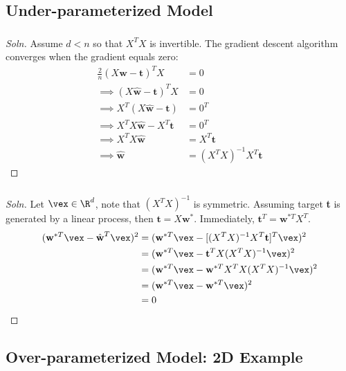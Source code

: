 \documentclass{article}
\begin{document}
	\subsection{Under-parameterized Model}
	\subsubsection{}
	\begin{proof}[Soln]
		Assume $d < n$ so that $X^T X$ is invertible. The gradient descent algorithm converges when the gradient equals zero:
		\begin{align}
			\frac{2}{n} (X \hat{\textbf{w}} - \textbf{t})^T X &= 0 \\
			\implies (X \hat{\textbf{w}} - \textbf{t})^T X &= 0 \\
			\implies X^T (X \hat{\textbf{w}} - \textbf{t}) &= 0^T \\
			\implies X^T X \hat{\textbf{w}} - X^T \textbf{t} &= 0^T \\
			\implies X^T X \hat{\textbf{w}} &= X^T \textbf{t} \\
			\implies \hat{\textbf{w}} &= (X^T X)^{-1} X^T \textbf{t}
		\end{align}
	\end{proof}
	\subsubsection{}
	\begin{proof}[Soln]
		Let $\vex \in \R^d$, note that $(X^T X)^{-1}$ is symmetric. Assuming target \textbf{t} is generated by a linear process, then $\textbf{t} = X \textbf{w}^*$. Immediately, $\textbf{t}^T = \textbf{w}^{*T} X^T$.
		\begin{align}
			(\textbf{w}^{*T} \vex  -  \hat{\textbf{w}}^{T} \vex)^2 
			&= (\textbf{w}^{*T} \vex - [(X^T X)^{-1} X^T \textbf{t}]^T \vex)^2 \\
			&= (\textbf{w}^{*T} \vex - \textbf{t}^T X (X^T X)^{-1} \vex)^2 \\
			&= (\textbf{w}^{*T} \vex - \textbf{w}^{*T} X^T X (X^T X)^{-1} \vex)^2 \\
			&= (\textbf{w}^{*T} \vex - \textbf{w}^{*T} \vex)^2 \\
			&= 0
		\end{align}
	\end{proof}
	
	\subsection{Over-parameterized Model: 2D Example}
\end{document}
